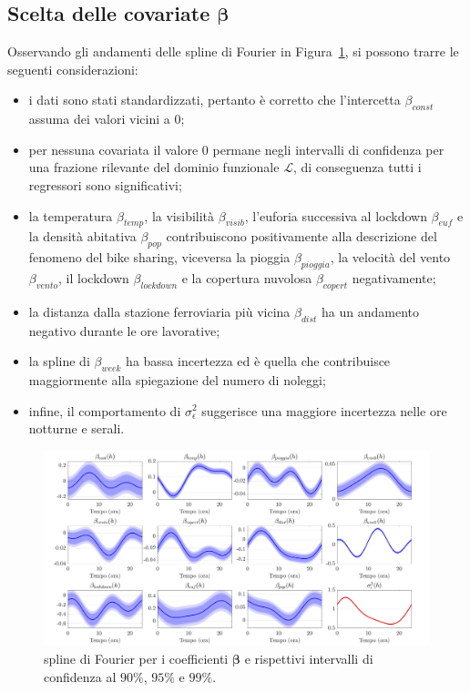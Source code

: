 \subsection{Scelta delle covariate $\boldsymbol{\beta}$}
Osservando gli andamenti delle spline di Fourier in Figura~\ref{trend_beta}, si possono trarre le seguenti considerazioni:
\begin{itemize}
	\item i dati sono stati standardizzati, pertanto è corretto che l'intercetta $\beta_{const}$ assuma dei valori vicini a \num{0};
	\item per nessuna covariata il valore \num{0} permane negli intervalli di confidenza per una frazione rilevante del dominio funzionale $\mathcal{L}$, di conseguenza tutti i regressori sono significativi;
	\item la temperatura $\beta_{temp}$, la visibilità $\beta_{visib}$, l'euforia successiva al lockdown $\beta_{euf}$ e la densità abitativa $\beta_{pop}$ contribuiscono positivamente alla descrizione del fenomeno del bike sharing, viceversa la pioggia $\beta_{pioggia}$, la velocità del vento $\beta_{vento}$, il lockdown $\beta_{lockdown}$ e la copertura nuvolosa $\beta_{copert}$ negativamente;
	\item la distanza dalla stazione ferroviaria più vicina $\beta_{dist}$ ha un andamento negativo durante le ore lavorative;
	\item la spline di $\beta_{week}$ ha bassa incertezza ed è quella che contribuisce maggiormente alla spiegazione del numero di noleggi;
	\item infine, il comportamento di $\sigma_\epsilon^2$ suggerisce una maggiore incertezza nelle ore notturne e serali. 
\end{itemize}

\begin{figure}[htpb]
	\centering
	\includegraphics[height=215px]{Immagini/4. Caso di studio/Model selection/Trend spline, rho=100m}
	\caption[Spline di Fourier per i coefficienti $\boldsymbol{\beta}$ e rispettivi intervalli di confidenza]{spline di Fourier per i coefficienti $\boldsymbol{\beta}$ e rispettivi intervalli di confidenza al $90\%$, $95\%$ e $99\%$.}
	\label{trend_beta}
\end{figure}

